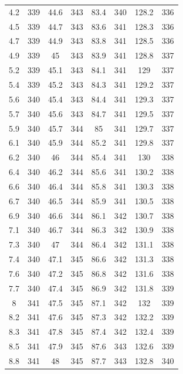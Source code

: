 \documentclass[12pt]{ctexart}
\numberwithin{equation}{section}
\begin{document}
\begin{longtable}{cc|cc|cc|cc}
4.2  &  339  &  44.6  &  343  &  83.4  &  340  &  128.2  &  336  \\
4.5  &  339  &  44.7  &  343  &  83.6  &  341  &  128.3  &  336  \\
4.7  &  339  &  44.9  &  343  &  83.8  &  341  &  128.5  &  336  \\
4.9  &  339  &  45  &  343  &  83.9  &  341  &  128.8  &  337  \\
5.2  &  339  &  45.1  &  343  &  84.1  &  341  &  129  &  337  \\
5.4  &  339  &  45.2  &  343  &  84.3  &  341  &  129.2  &  337  \\
5.6  &  340  &  45.4  &  343  &  84.4  &  341  &  129.3  &  337  \\
5.7  &  340  &  45.6  &  343  &  84.7  &  341  &  129.5  &  337  \\
5.9  &  340  &  45.7  &  344  &  85  &  341  &  129.7  &  337  \\
6.1  &  340  &  45.9  &  344  &  85.2  &  341  &  129.8  &  337  \\
6.2  &  340  &  46  &  344  &  85.4  &  341  &  130  &  338  \\
6.4  &  340  &  46.2  &  344  &  85.6  &  341  &  130.2  &  338  \\
6.6  &  340  &  46.4  &  344  &  85.8  &  341  &  130.3  &  338  \\
6.7  &  340  &  46.5  &  344  &  85.9  &  341  &  130.5  &  338  \\
6.9  &  340  &  46.6  &  344  &  86.1  &  342  &  130.7  &  338  \\
7.1  &  340  &  46.7  &  344  &  86.3  &  342  &  130.9  &  338  \\
7.3  &  340  &  47  &  344  &  86.4  &  342  &  131.1  &  338  \\
7.4  &  340  &  47.1  &  345  &  86.6  &  342  &  131.3  &  338  \\
7.6  &  340  &  47.2  &  345  &  86.8  &  342  &  131.6  &  338  \\
7.7  &  340  &  47.4  &  345  &  86.9  &  342  &  131.8  &  339  \\
8  &  341  &  47.5  &  345  &  87.1  &  342  &  132  &  339  \\
8.2  &  341  &  47.6  &  345  &  87.3  &  342  &  132.2  &  339  \\
8.3  &  341  &  47.8  &  345  &  87.4  &  342  &  132.4  &  339  \\
8.5  &  341  &  47.9  &  345  &  87.6  &  343  &  132.6  &  339  \\
8.8  &  341  &  48  &  345  &  87.7  &  343  &  132.8  &  340  \\

\end{longtable}
\end{document}
